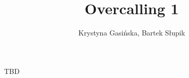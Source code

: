 \documentclass[12pt, a4paper]{article}
\title{Overcalling 1\ntx}
\author{Krystyna Gasińska, Bartek Słupik}
\begin{document}
\maketitle


TBD

\end{document}
